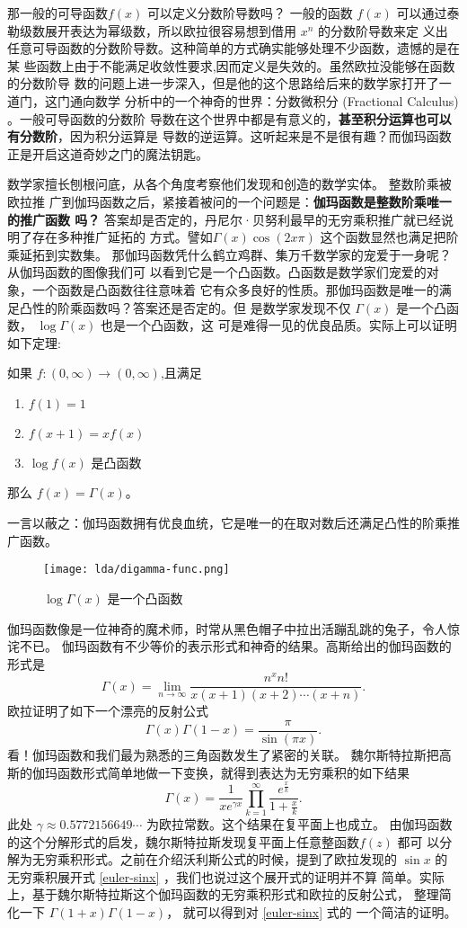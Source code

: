 {那一般的可导函数$f(x)$ 可以定义分数阶导数吗？ 一般的函数 $f(x)$ 可以通过泰
勒级数展开表达为幂级数，所以欧拉很容易想到借用 $x^n$ 的分数阶导数来定
义出任意可导函数的分数阶导数。这种简单的方式确实能够处理不少函数，遗憾的是在某
些函数上由于不能满足收敛性要求,因而定义是失效的。虽然欧拉没能够在函数的分数阶导
数的问题上进一步深入，但是他的这个思路给后来的数学家打开了一道门，这门通向数学
分析中的一个神奇的世界：分数微积分 (Fractional Calculus) 。一般可导函数的分数阶
导数在这个世界中都是有意义的，{\bf 甚至积分运算也可以有分数阶}，因为积分运算是
导数的逆运算。这听起来是不是很有趣？而伽玛函数正是开启这道奇妙之门的魔法钥匙。 


数学家擅长刨根问底，从各个角度考察他们发现和创造的数学实体。 整数阶乘被欧拉推
广到伽玛函数之后，紧接着被问的一个问题是：{\bf 伽玛函数是整数阶乘唯一的推广函数
吗？} 答案却是否定的，丹尼尔·贝努利最早的无穷乘积推广就已经说明了存在多种推广延拓的
方式。譬如$\Gamma(x) \cos (2x\pi)$ 这个函数显然也满足把阶乘延拓到实数集。 
那伽玛函数凭什么鹤立鸡群、集万千数学家的宠爱于一身呢？从伽玛函数的图像我们可
以看到它是一个凸函数。凸函数是数学家们宠爱的对象，一个函数是凸函数往往意味着
它有众多良好的性质。那伽玛函数是唯一的满足凸性的阶乘函数吗？答案还是否定的。但
是数学家发现不仅 $\Gamma(x)$ 是一个凸函数， $\log\Gamma(x)$ 也是一个凸函数，这
可是难得一见的优良品质。实际上可以证明如下定理:
\begin{theorem} 如果 $f:(0,\infty)\rightarrow (0,\infty)$,且满足
\begin{enumerate}
\item $f(1) = 1$
\item $f(x+1) = xf(x)$
\item $\log f(x)$ 是凸函数
\end{enumerate}
那么 $f(x) = \Gamma(x)$。
\end{theorem}
一言以蔽之：伽玛函数拥有优良血统，它是唯一的在取对数后还满足凸性的阶乘推广函数。

\begin{figure}[H]
\centering
\texttt{[image: lda/digamma-func.png]}
\caption{$\log \Gamma(x)$ 是一个凸函数}
\end{figure}

伽玛函数像是一位神奇的魔术师，时常从黑色帽子中拉出活蹦乱跳的兔子，令人惊诧不已。
伽玛函数有不少等价的表示形式和神奇的结果。高斯给出的伽玛函数的形式是
$$ \Gamma(x) = \lim_{n\rightarrow\infty} \frac{n^x n!}{x(x+1)(x+2)\cdots(x+n)} .$$
欧拉证明了如下一个漂亮的反射公式
$$ \Gamma(x) \Gamma(1-x) = \frac{\pi}{\sin (\pi x)} .$$
看！伽玛函数和我们最为熟悉的三角函数发生了紧密的关联。
魏尔斯特拉斯把高斯的伽玛函数形式简单地做一下变换，就得到表达为无穷乘积的如下结果
$$ {\Gamma(x)} = \frac{1}{xe^{\gamma x}} \prod_{k=1}^\infty
\frac{e^{\frac{x}{k}}} {1+\frac{x}{k}} .$$
此处 $\gamma \approx 0.5772156649\cdots$ 为欧拉常数。这个结果在复平面上也成立。
由伽玛函数的这个分解形式的启发，魏尔斯特拉斯发现复平面上任意整函数$f(z)$ 都可
以分解为无穷乘积形式。之前在介绍沃利斯公式的时候，提到了欧拉发现的
$\sin x$ 的无穷乘积展开式 \eqref{euler-sinx} ，我们也说过这个展开式的证明并不算
简单。实际上，基于魏尔斯特拉斯这个伽玛函数的无穷乘积形式和欧拉的反射公式，
整理简化一下 $\Gamma(1+x)\Gamma(1-x)$， 就可以得到对 \eqref{euler-sinx} 式的
一个简洁的证明。

}
